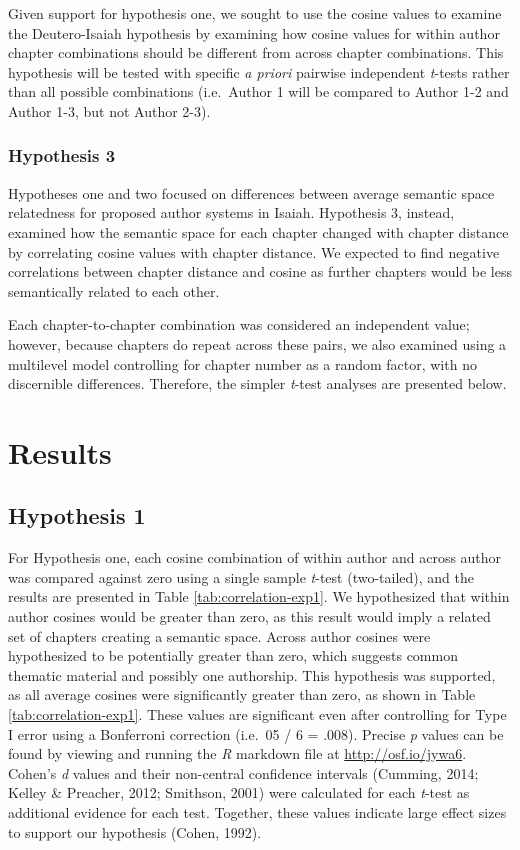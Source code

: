 \documentclass[english,man]{apa6}
\newcounter{author}
\theoremstyle{definition}
\theoremstyle{definition}
\theoremstyle{definition}
\theoremstyle{remark}
\begin{document}
Given support for hypothesis one, we sought to use the cosine values to
examine the Deutero-Isaiah hypothesis by examining how cosine values for
within author chapter combinations should be different from across
chapter combinations. This hypothesis will be tested with specific
\emph{a priori} pairwise independent \emph{t}-tests rather than all
possible combinations (i.e.~Author 1 will be compared to Author 1-2 and
Author 1-3, but not Author 2-3).

\subsubsection{Hypothesis 3}\label{hypothesis-3}

Hypotheses one and two focused on differences between average semantic
space relatedness for proposed author systems in Isaiah. Hypothesis 3,
instead, examined how the semantic space for each chapter changed with
chapter distance by correlating cosine values with chapter distance. We
expected to find negative correlations between chapter distance and
cosine as further chapters would be less semantically related to each
other.

Each chapter-to-chapter combination was considered an independent value;
however, because chapters do repeat across these pairs, we also examined
using a multilevel model controlling for chapter number as a random
factor, with no discernible differences. Therefore, the simpler
\emph{t}-test analyses are presented below.

\section{Results}\label{results}

\subsection{Hypothesis 1}\label{hypothesis-1-1}

For Hypothesis one, each cosine combination of within author and across
author was compared against zero using a single sample \emph{t}-test
(two-tailed), and the results are presented in Table
\ref{tab:correlation-exp1}. We hypothesized that within author cosines
would be greater than zero, as this result would imply a related set of
chapters creating a semantic space. Across author cosines were
hypothesized to be potentially greater than zero, which suggests common
thematic material and possibly one authorship. This hypothesis was
supported, as all average cosines were significantly greater than zero,
as shown in Table \ref{tab:correlation-exp1}. These values are
significant even after controlling for Type I error using a Bonferroni
correction (i.e.~05 / 6 = .008). Precise \emph{p} values can be found by
viewing and running the \emph{R} markdown file at
\url{http://osf.io/jywa6}. Cohen's \emph{d} values and their non-central
confidence intervals (Cumming, 2014; Kelley \& Preacher, 2012; Smithson,
2001) were calculated for each \emph{t}-test as additional evidence for
each test. Together, these values indicate large effect sizes to support
our hypothesis (Cohen, 1992).
\end{document}
